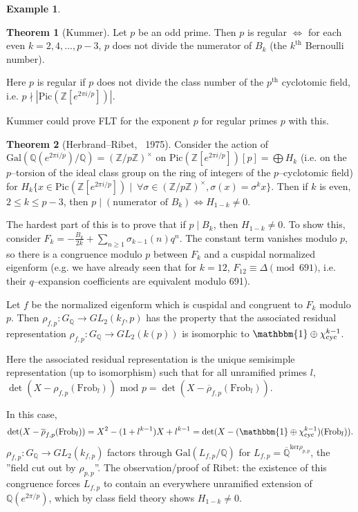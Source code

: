 \documentclass{article}
\theoremstyle{definition}
\newtheorem{theorem}{Theorem}[section]
\newtheorem{example}{Example}[section]
\begin{document}
\begin{example}
    \begin{theorem}[Kummer]
        Let $p$ be an odd prime. Then $p$ is regular $\iff$ for each even $k=2,4,\ldots,p-3$, $p$ does not divide the numerator of $B_k$ (the $k^{\text{th}}$ Bernoulli number).
    \end{theorem}
    Here $p$ is regular if $p$ does not divide the class number of the $p^{\text{th}}$ cyclotomic field, i.e. $p \nmid |\text{Pic}(\mathbb{Z}[e^{2\pi i/p}])|$.
    \vspace{1mm}
     
    Kummer could prove FLT for the exponent $p$ for regular primes $p$ with this.
    \begin{theorem}[Herbrand--Ribet, ~1975]
        Consider the action of $\text{Gal}(\mathbb{Q}(e^{2\pi i/p})/\mathbb{Q}) = (\mathbb{Z}/p\mathbb{Z})^\times$ on $\text{Pic}(\mathbb{Z}[e^{2\pi i/p}])[p] = \bigoplus H_k$ (i.e. on the $p$--torsion of the ideal class group on the ring of integers of the $p$--cyclotomic field) for $H_k \{x \in \text{Pic}(\mathbb{Z}[e^{2\pi i /p}]) \mid ~\forall \sigma \in (\mathbb{Z}/p\mathbb{Z})^\times, \sigma(x)=\sigma^k x\}$. Then if $k$ is even, $2\le k\le p-3$, then $p \mid (\text{numerator of }B_k) \iff H_{1-k} \neq 0$.
    \end{theorem}
    The hardest part of this is to prove that if $p \mid B_k$, then $H_{1-k} \neq 0$. To show this, consider $F_k = -\frac{B_k}{2k}+\sum_{n\ge 1}^{} \sigma_{k-1}(n)q^n$. The constant term vanishes modulo $p$, so there is a congruence modulo $p$ between $F_k$ and a cuspidal normalized eigenform (e.g. we have already seen that for $k=12$, $F_{12} \equiv \Delta \pmod{691}$, i.e. their $q$--expansion coefficients are equivalent modulo 691).
    \vspace{1mm}
     
    Let $f$ be the normalized eigenform which is cuspidal and congruent to $F_k$ modulo $p$. Then $\rho_{f,p} : G_\mathbb{Q} \to GL_2(k_f,p)$ has the property that the associated residual representation $\rho_{f,p} : G_{\mathbb{Q}} \to GL_2(k(p))$ is isomorphic to $\mathbbm{1} \oplus \chi_{\text{cyc}}^{k-1}$.
    \vspace{1mm}
     
    Here the associated residual representation is the unique semisimple representation (up to isomorphism) such that for all unramified primes $l$, $\det(X-\rho_{f,p}(\text{Frob}_l))\text{ mod }p = \det(X-\overline{\rho}_{f,p}(\text{Frob}_l))$.
    \vspace{1mm}
     
    In this case, $$\det(X-\overline{\rho}_{f,p}(\text{Frob}_l)) = X^2 - (1+l^{k-1})X + l^{k-1} = \det(X-(\mathbbm{1}\oplus \chi_{\text{cyc}}^{k-1})(\text{Frob}_l)).$$ $\rho_{f,p}:G_\mathbb{Q} \to GL_2(k_{f,p})$ factors through $\text{Gal}(L_{f,p}/\mathbb{Q})$ for $L_{f,p} = \overline{\mathbb{Q}}^{\text{ker}\rho_{p,p}}$, the ''field cut out by $\rho_{p,p}$''. The observation/proof of Ribet: the existence of this congruence forces $L_{f,p}$ to contain an everywhere unramified extension of $\mathbb{Q}(e^{2\pi/p})$, which by class field theory shows $H_{1-k}\neq 0$.
\end{example}
\end{document}
